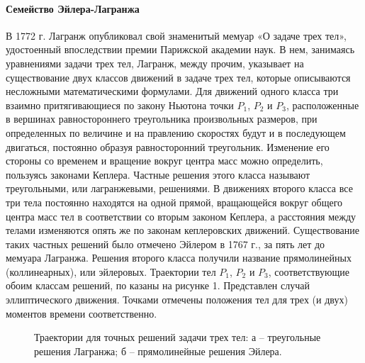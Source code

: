 \documentclass[a4paper, 12pt]{article}%
\begin{document}
\paragraph{Семейство Эйлера-Лагранжа}
В 1772 г. Лагранж опубликовал свой знаменитый мемуар «О задаче трех тел», удостоенный впоследствии премии Парижской академии наук. В нем, занимаясь уравнениями задачи
трех тел, Лагранж, между прочим, указывает на существование двух классов движений в задаче трех тел, которые описываются несложными математическими формулами.
Для движений одного класса три взаимно притягивающиеся по закону Ньютона точки
$P_1$, $P_2$ и $P_3$, расположенные в вершинах равностороннего треугольника произвольных размеров, при определенных по величине и на правлению скоростях будут и в последующем двигаться, постоянно образуя равносторонний треугольник. Изменение его стороны со временем
и вращение вокруг центра масс можно определить, пользуясь законами Кеплера. Частные решения этого класса называют треугольными, или лагранжевыми, решениями.
В движениях второго класса все три тела постоянно находятся на одной прямой, вращающейся вокруг общего центра масс тел в соответствии со вторым законом Кеплера, а расстояния между телами изменяются опять же по законам кеплеровских движений. Существование таких частных решений было отмечено Эйлером в 1767 г., за пять лет до мемуара Лагранжа. Решения второго класса получили название прямолинейных (коллинеарных), или эйлеровых.
Траектории тел $P_1$, $P_2$ и $P_3$, соответствующие обоим классам решений, по казаны на рисунке 1. Представлен случай эллиптического движения. Точками отмечены положения тел
для трех (и двух) моментов времени соответственно. 
\begin{figure}[h!]
\caption{Траектории для точных решений задачи трех тел: а -- треугольные решения Лагранжа; б -- прямолинейные решения Эйлера. }
\end{figure}
\end{document}
